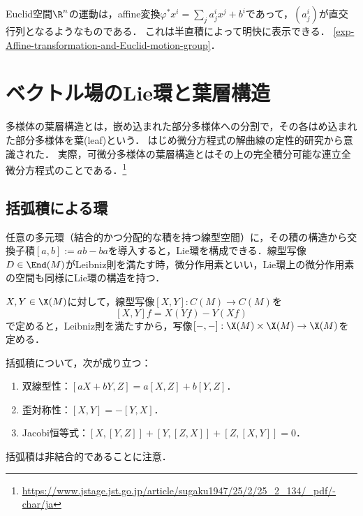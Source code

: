 \documentclass[uplatex,dvipdfmx]{jsreport}
\begin{document}
\begin{theorem}
    Euclid空間$\R^n$の運動は，affine変換$\varphi^*x^i=\sum_ja^i_jx^j+b^i$であって，$(a^i_j)$が直交行列となるようなものである．
    これは半直積によって明快に表示できる．
    \ref{exp-Affine-transformation-and-Euclid-motion-group}．
\end{theorem}

\section{ベクトル場のLie環と葉層構造}

\begin{tcolorbox}[colframe=ForestGreen, colback=ForestGreen!10!white,breakable,colbacktitle=ForestGreen!40!white,coltitle=black,fonttitle=\bfseries\sffamily,
title=]
    多様体の葉層構造とは，嵌め込まれた部分多様体への分割で，その各はめ込まれた部分多様体を葉(leaf)という．
    はじめ微分方程式の解曲線の定性的研究から意識された．
    実際，可微分多様体の葉層構造とはその上の完全積分可能な連立全微分方程式のことである．\footnote{\url{https://www.jstage.jst.go.jp/article/sugaku1947/25/2/25_2_134/_pdf/-char/ja}}
\end{tcolorbox}

\subsection{括弧積による環}

\begin{tcolorbox}[colframe=ForestGreen, colback=ForestGreen!10!white,breakable,colbacktitle=ForestGreen!40!white,coltitle=black,fonttitle=\bfseries\sffamily,
title=]
    任意の多元環（結合的かつ分配的な積を持つ線型空間）に，その積の構造から交換子積$[a,b]:=ab-ba$を導入すると，Lie環を構成できる．線型写像$D\in\End(M)$がLeibniz則を満たす時，微分作用素といい，Lie環上の微分作用素の空間も同様にLie環の構造を持つ．
\end{tcolorbox}

\begin{definition}[括弧積]
    $X,Y\in\X(M)$に対して，線型写像$[X,Y]:C(M)\to C(M)$を
    \[[X,Y]f=X(Yf)-Y(Xf)\]
    で定めると，Leibniz則を満たすから，写像$[-,-]:\X(M)\times\X(M)\to\X(M)$を定める．
\end{definition}

\begin{lemma}[Lie環の構造を持つ]
    括弧積について，次が成り立つ：
    \begin{enumerate}
        \item 双線型性：$[aX+bY,Z]=a[X,Z]+b[Y,Z]$．
        \item 歪対称性：$[X,Y]=-[Y,X]$．
        \item Jacobi恒等式：$[X,[Y,Z]]+[Y,[Z,X]]+[Z,[X,Y]]=0$．
    \end{enumerate}
    括弧積は非結合的であることに注意．
\end{lemma}
\end{document}
